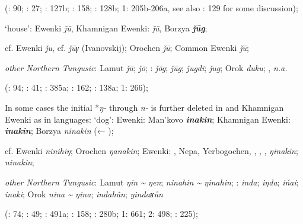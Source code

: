 \documentclass[output=paper,colorlinks,citecolor=brown]{langscibook}
\begin{document}
    (\citealt{Castrén1856}: 90; \citealt{Janhunen1991}: 27; \citealt{Dorji1998}: 127b; \citealt{Chaoke2014a}: 158; \citealt{Vasilevic1958}: 128b; \citealt{Cincius1975B} 1: 205b-206a, see also \citealt{Hölzl2018b}: 129 for some discussion);

    \ex ‘house’:  Ewenki \textit{ǰū}, Khamnigan Ewenki:  \textit{ǰū}, Borzya \textbf{\textit{ǰūg}};

    cf.  Ewenki \textit{ǰu}, cf. \textit{ǰūγ} (Ivanovskij); Orochen \textit{ǰū};  Common Ewenki \textit{ǰū};

    \textit{other Northern Tungusic}: Lamut \textit{ǰū};  \textit{ǰō}; \textit{}:  \textit{ǰōg};  \textit{ǰūg};  \textit{ǰugdi};  \textit{ǰug}; Orok \textit{duku}; ,  \textit{n.a.}
    
    (\citealt{Castrén1856}: 94; \citealt{Janhunen1991}: 41; \citealt{Dorji1998}: 385a; \citealt{Chaoke2014a}: 162; \citealt{Vasilevic1958}: 138a; \citealt{Cincius1975B} 1: 266);
\z
\z


\ea
In some cases the initial *\textit{ŋ-} through \textit{n-} is further deleted in  and Khamnigan Ewenki as in  languages:
\ea  ‘dog’:  Ewenki: Man’kovo \textbf{\textit{inakin}}; Khamnigan Ewenki:  \textbf{\textit{inakin}}; Borzya \textit{ninakin} (← );

    cf.  Ewenki \textit{ninihiŋ}; Orochen \textit{ŋanakin};  Ewenki: , Nepa, Yerbogochen, , , ,  \textit{ŋinakin};  \textit{ninakin};

    \textit{other Northern Tungusic}: Lamut \textit{ŋin {\textasciitilde} ŋen};  \textit{ninahin {\textasciitilde} ŋinahin}; \textit{}:  \textit{inda};  \textit{iŋda};  \textit{ińai};  \textit{inaki}; Orok \textit{nina {\textasciitilde} ŋina};  \textit{indahûn};  \textit{yindaʁůn}
    
    (\citealt{Castrén1856}: 74; \citealt{Janhunen1991}: 49; \citealt{Dorji1998}: 491a; \citealt{Chaoke2014a}: 158; \citealt{Vasilevic1958}: 280b; \citealt{Cincius1975B} 1: 661; \citealt{Hauer1952} 2: 498; \citealt{Zikmundová2013a}: 225);
\end{document}
